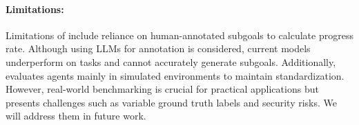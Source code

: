 \paragraph{Limitations:}
Limitations of \BenchName{} include reliance on human-annotated subgoals to calculate progress rate. Although using LLMs for annotation is considered, current models underperform on \BenchName{} tasks and cannot accurately generate subgoals. Additionally, \BenchName{} evaluates agents mainly in simulated environments to maintain standardization. However, real-world benchmarking is crucial for practical applications but presents challenges such as variable ground truth labels and security risks. We will address them in future work. 